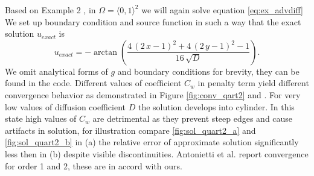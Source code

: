 \begin{example}
\label{ex:quart2}
Based on Example 2 \cite{Antonietti2013},
in $\Omega = \langle 0, 1 \rangle^2$ we will again solve equation \eqref{eq:ex_advdiff}
We set up boundary condition and source function in such a way that the exact 
solution $u_{exact}$ is
\begin{equation}
	u_{exact} =  -\arctan\left(\frac{4 \, {\left(2 \, x - 1\right)}^{2} + 4 \, {\left(2 
	\, y - 1\right)}^{2} - 
	1}{16 \, \sqrt{\mathit{D}}}\right).
\end{equation}
We omit analytical forms of $g$ and boundary conditions for brevity, they can be found in 
the code. Different values of coefficient $C_w$ in penalty term yield different 
convergence behavior as demonstrated in Figure \ref{fig:conv_qart2} and 
. For very low values of diffusion coefficient $D$ the 
solution develops into cylinder. In this state high values of $C_w$ are detrimental as 
they prevent steep edges and cause artifacts in solution, for illustration compare 
\cref{fig:sol_quart2_a} and \cref{fig:sol_quart2_b} in (a) the relative error of 
approximate solution significantly less then in (b) despite visible discontinuities. 
Antonietti et al. \cite{Antonietti2013} report convergence for order 1 and 2, these are 
in accord with ours.

\end{example}
